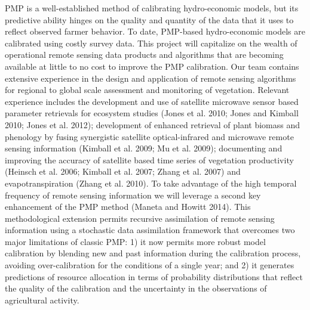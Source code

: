 PMP is a well-established method of calibrating hydro-economic models, but its predictive ability hinges on the quality and quantity of the data that it uses to reflect observed farmer behavior. To date, PMP-based hydro-economic models are calibrated using costly survey data. This project will capitalize on the wealth of operational remote sensing data products and algorithms that are becoming available at little to no cost to improve the PMP calibration. Our team contains extensive experience in the design and application of remote sensing algorithms for regional to global scale assessment and monitoring of vegetation. Relevant experience includes the development and use of satellite microwave sensor based parameter retrievals for ecosystem studies (Jones et al. 2010; Jones and Kimball 2010; Jones et al. 2012); development of enhanced retrieval of plant biomass and phenology by fusing synergistic satellite optical-infrared and microwave remote sensing information (Kimball et al. 2009; Mu et al. 2009); documenting and improving the accuracy of satellite based time series of vegetation productivity (Heinsch et al. 2006; Kimball et al. 2007; Zhang et al. 2007) and evapotranspiration (Zhang et al. 2010). 
To take advantage of the high temporal frequency of remote sensing information we will leverage a second key enhancement of the PMP method (Maneta and Howitt 2014). This methodological extension permits recursive assimilation of remote sensing information using a stochastic data assimilation framework that overcomes two major limitations of classic PMP: 1) it now permits more robust model calibration by blending new and past information during the calibration process, avoiding over-calibration for the conditions of a single year; and 2) it generates predictions of resource allocation in terms of probability distributions that reflect the quality of the calibration and the uncertainty in the observations of agricultural activity.
